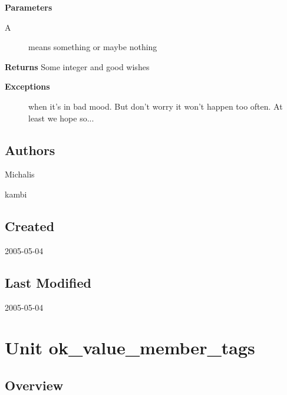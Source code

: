 \documentclass{report}
\begin{document}
\begin{list}{}
  \par
\item[\textbf{Parameters}]
\begin{description}
\item[A] means something or maybe nothing
\end{description}
\item[\textbf{Returns}]Some integer and good wishes
\item[\textbf{Exceptions}]
\begin{description}
\item[\begin{ttfamily}EBar\end{ttfamily}(\ref{ok_expanding_descriptions.EBar})] when it's in bad mood. But don't worry it won't happen too often. At least we hope so...
\end{description}


\end{list}
\section{Authors}
\par
Michalis

\par
kambi

\section{Created}
\par
2005{-}05{-}04


\section{Last Modified}
\par
2005{-}05{-}04


\chapter{Unit ok{\_}value{\_}member{\_}tags}
\label{ok_value_member_tags}
\section{Overview}
\begin{description}
\item[\texttt{\begin{ttfamily}TMyClass\end{ttfamily} Class}]
\item[\texttt{\begin{ttfamily}TMyRecord\end{ttfamily} Record}]
\end{description}
\end{document}
